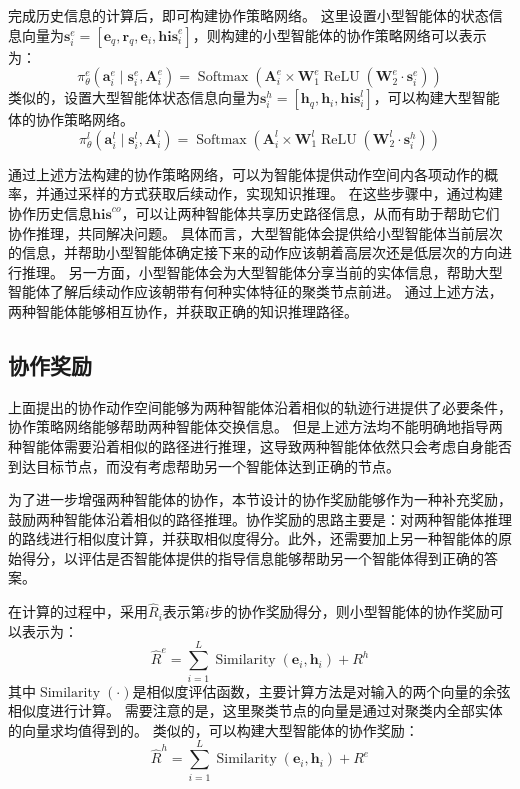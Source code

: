 \documentclass[algorithmlist, AutoFakeBold, AutoFakeSlant, figurelist, tablelist, nomlist, engineering]{seuthesix}
\begin{document}
完成历史信息的计算后，即可构建协作策略网络。
这里设置小型智能体的状态信息向量为$\bm{s}_i^{e} = \left[\bm{e}_q, \bm{r}_q, \bm{e}_i, \bm{his}_i^e\right]$，则构建的小型智能体的协作策略网络可以表示为：
\begin{equation}
  \pi_\theta^e\left(\bm{a}_i^e \mid \bm{s}_i^e, \bm{A}_i^e\right) =\operatorname{Softmax}\left(\bm{A}_i^e \times \mathbf{W}_1^e \operatorname{ReLU}\left(\mathbf{W}_2^e \cdot \bm{s}_i^{e}\right)\right)
  \label{pi_1}
\end{equation}
类似的，设置大型智能体状态信息向量为$\bm{s}_i^{h} = \left[\bm{h}_q, \bm{h}_i, \bm{his}_i^l\right]$，可以构建大型智能体的协作策略网络。
\begin{equation}
  \pi_\theta^l\left(\bm{a}_i^l \mid \bm{s}_i^l, \bm{A}_i^l\right) =\operatorname{Softmax}\left(\bm{A}_i^l \times \mathbf{W}_1^l \operatorname{ReLU}\left(\mathbf{W}_2^l \cdot \bm{s}_i^{h}\right)\right)
  \label{pi_2}
\end{equation}

通过上述方法构建的协作策略网络，可以为智能体提供动作空间内各项动作的概率，并通过采样的方式获取后续动作，实现知识推理。
在这些步骤中，通过构建协作历史信息$\bm{his}^{co}$，可以让两种智能体共享历史路径信息，从而有助于帮助它们协作推理，共同解决问题。
具体而言，大型智能体会提供给小型智能体当前层次的信息，并帮助小型智能体确定接下来的动作应该朝着高层次还是低层次的方向进行推理。
另一方面，小型智能体会为大型智能体分享当前的实体信息，帮助大型智能体了解后续动作应该朝带有何种实体特征的聚类节点前进。
通过上述方法，两种智能体能够相互协作，并获取正确的知识推理路径。

\subsection{协作奖励}
上面提出的协作动作空间能够为两种智能体沿着相似的轨迹行进提供了必要条件，协作策略网络能够帮助两种智能体交换信息。
但是上述方法均不能明确地指导两种智能体需要沿着相似的路径进行推理，这导致两种智能体依然只会考虑自身能否到达目标节点，而没有考虑帮助另一个智能体达到正确的节点。

为了进一步增强两种智能体的协作，本节设计的协作奖励能够作为一种补充奖励，鼓励两种智能体沿着相似的路径推理。协作奖励的思路主要是：对两种智能体推理的路线进行相似度计算，并获取相似度得分。此外，还需要加上另一种智能体的原始得分，以评估是否智能体提供的指导信息能够帮助另一个智能体得到正确的答案。

在计算的过程中，采用$\hat{R}_i$表示第$i$步的协作奖励得分，则小型智能体的协作奖励可以表示为：
\begin{equation}
  \hat{R}^e = \sum_{i=1}^{L} \operatorname{Similarity}(\bm{e}_i, \bm{h}_i) + R^h
  \label{similar_1}
\end{equation}
其中$\operatorname{Similarity}(\cdot)$是相似度评估函数，主要计算方法是对输入的两个向量的余弦相似度进行计算。
需要注意的是，这里聚类节点的向量是通过对聚类内全部实体的向量求均值得到的。
类似的，可以构建大型智能体的协作奖励：
\begin{equation}
  \hat{R}^h = \sum_{i=1}^{L} \operatorname{Similarity}(\bm{e}_i, \bm{h}_i) + R^e
  \label{similar_2}
\end{equation}
\end{document}
